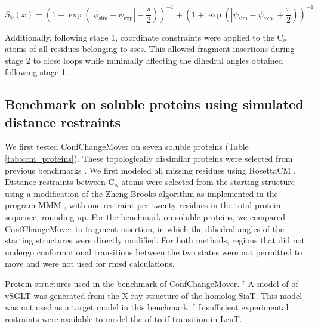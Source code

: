 \begin{equation}
    S_{\uppsi}(x) = \left( 1 + \exp \left( | \psi_{\mathup{sim}} - \psi_{\mathup{exp}} | - \frac{\pi}{2} \right) \right)^{-1} + \left( 1 + \exp \left( | \psi_{\mathup{sim}} - \psi_{\mathup{exp}} | + \frac{\pi}{2} \right) \right)^{-1}
\end{equation}

Additionally, following stage 1, coordinate constraints were applied to the $\mathrm{C_{\upalpha}}$ atoms of all residues belonging to \gls{sse}s. This allowed fragment insertions during stage 2 to close loops while minimally affecting the dihedral angles obtained following stage 1.

\subsection{Benchmark on soluble proteins using simulated distance restraints}

We first tested ConfChangeMover on seven soluble proteins (Table \ref{tab:ccm_proteins}). These topologically dissimilar proteins were selected from previous benchmarks \citep*{Jeschke2012, Sfriso2016}. We first modeled all missing residues using RosettaCM \citep*{Song2013}. Distance restraints between $\mathrm{C_{\upalpha}}$ atoms were selected from the starting structure using a modification of the Zheng-Brooks algorithm as implemented in the program MMM \citep*{Jeschke2012, Jeschke2018a, Polyhach2011, Zheng2005}, with one restraint per twenty residues in the total protein sequence, rounding up. For the benchmark on soluble proteins, we compared ConfChangeMover to fragment insertion, in which the dihedral angles of the starting structures were directly modified. For both methods, regions that did not undergo conformational transitions between the two states were not permitted to move and were not used for \gls{rmsd} calculations.

\begin{table}[h]
\scriptsize
\renewcommand{\tabcolsep}{0.09cm}
\centering
\caption[Protein structures used in the benchmark of ConfChangeMover.]{Protein structures used in the benchmark of ConfChangeMover. $^{\dagger}$ A model of \gls{of} vSGLT was generated from the X-ray structure of the homolog SiaT. This model was not used as a target model in this benchmark. $^{\ddagger}$ Insufficient experimental restraints were available to model the \gls{of}-to-\gls{if} transition in LeuT.}

\label{tab:ccm_proteins}
\end{table}

